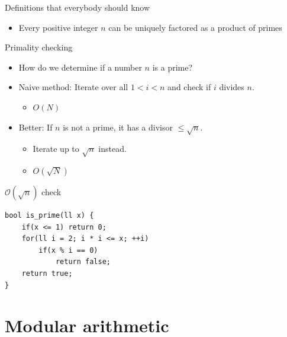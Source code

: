 \documentclass{beamer}
\begin{document}
\begin{frame}[plain]{Definitions that everybody should know}
  \vspace{15pt}
  \begin{itemize}
    \item Every positive integer $n$ can be uniquely factored as a product of primes
  \end{itemize}
\end{frame}

\begin{frame}[plain]{Primality checking}
  \vspace{20pt}
  \begin{itemize}
    \item How do we determine if a number $n$ is a prime?
    \item {\color{dark green}Naive method:} Iterate over all $1 < i < n$ and check if
      $i$ divides $n$.
      \begin{itemize}
        \item  $O(N)$
      \end{itemize}
    \item {\color{dark green}Better:} If $n$ is not a prime, it has a divisor $\leq \sqrt{n}$.
      \begin{itemize}
        \item Iterate up to $\sqrt{n}$ instead.
        \item $O(\sqrt{N})$
      \end{itemize}
  \end{itemize}
\end{frame}

\begin{frame}{$\mathcal{O}(\sqrt{n})$ check}
\begin{verbatim}
bool is_prime(ll x) {
    if(x <= 1) return 0;
    for(ll i = 2; i * i <= x; ++i)
        if(x % i == 0)
            return false;
    return true;
}
\end{verbatim}
\end{frame}

\section*{Modular arithmetic}
\end{document}
